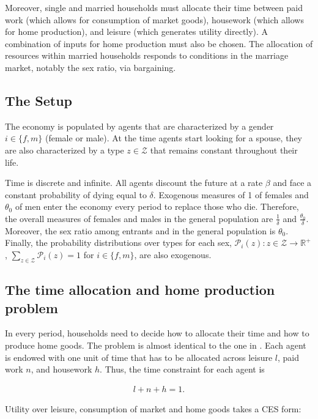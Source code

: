 \documentclass[12pt]{article}
\begin{document}
Moreover, single and married households must allocate their time between paid work (which allows for consumption of market goods), housework (which allows for home production), and leisure (which generates utility directly). A combination of inputs for home production must also be chosen. The allocation of resources within married households responds to conditions in the marriage market, notably the sex ratio, via bargaining.
  
\subsection{The Setup}

The economy is populated by agents that are characterized by a gender $i\in \{f,m\}$ (female or male). At the time agents start looking for a spouse, they are also characterized by a type $z \in \mathcal{Z}$ that remains constant throughout their life. 

Time is discrete and infinite. All agents discount the future at a rate $\beta$ and face a constant probability of dying equal to $\delta$. Exogenous measures of 1 of females and $\theta_0$ of men enter the economy every period to replace those who die. Therefore, the overall measures of females and males in the general population are $\frac{1}{\delta}$ and $\frac{\theta_0}{\delta}$. Moreover, the sex ratio among entrants and in the general population is $\theta_0$. Finally, the probability distributions over types for each sex, $\mathcal{P}_i(z):z\in\mathcal{Z}\to\mathbb{R}^+$, $\sum_{z\in \mathcal{Z}}\mathcal{P}_i(z)=1$ for $i\in\{f,m\}$, are also exogenous.

\subsection{The time allocation and home production problem}

In every period, households need to decide how to allocate their time and how to produce home goods. The problem is almost identical to the one in \citet{knowles13}. Each agent is endowed with one unit of time that has to be allocated across leisure $l$, paid work $n$, and housework $h$. Thus, the time constraint for each agent is

\begin{align*}
	l+n+h=1.
\end{align*}

Utility over leisure, consumption of market and home goods takes a CES form:
\end{document}

